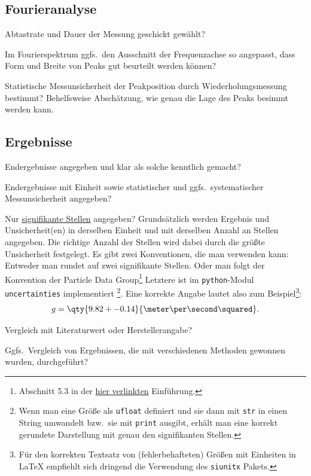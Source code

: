 \documentclass[twoside]{protokoll}
\begin{document}
\subsection*{Fourieranalyse}
\begin{checklist}
\item Abtastrate und Dauer der Messung geschickt gewählt?
\item Im Fourierspektrum ggfs.~den Ausschnitt der Frequenzachse so
  angepasst, dass Form und Breite von Peaks gut beurteilt werden
  können?
\item Statistische Messunsicherheit der Peakposition durch
  Wiederholungsmessung bestimmt? Behelfsweise Abschätzung, wie genau
  die Lage des Peaks besimmt werden kann.
\end{checklist}

\subsection*{Ergebnisse}
\begin{checklist}
\item Endergebnisse angegeben und klar als solche kenntlich gemacht?
\item Endergebnisse mit Einheit sowie statistischer und
  ggfs.~systematischer Messunsicherheit angegeben?
\item Nur
  \href{https://de.wikipedia.org/wiki/Signifikante_Stellen}{signifikante
    Stellen} angegeben? Grundsätzlich werden Ergebnis und
  Unsicherheit(en) in derselben Einheit und mit derselben Anzahl an
  Stellen angegeben. Die richtige Anzahl der Stellen wird dabei durch
  die größte Unsicherheit festgelegt. Es gibt zwei Konventionen, die
  man verwenden kann: Entweder man rundet auf zwei signifikante
  Stellen. Oder man folgt der Konvention der Particle Data
  Group\footnote{Abschnitt 5.3 in der
    \href{https://pdg.lbl.gov/2024/reviews/rpp2024-rev-rpp-intro.pdf}{hier
      verlinkten} Einführung.} Letztere ist im \texttt{python}-Modul
  \texttt{uncertainties} implementiert \footnote{Wenn man eine Größe
    als \texttt{ufloat} definiert und sie dann mit \texttt{str} in
    einen String umwandelt bzw.~sie mit \texttt{print} ausgibt, erhält
    man eine korrekt gerundete Darstellung mit genau den signifikanten
    Stellen.}. Eine korrekte Angabe lautet also zum
  Beispiel\footnote{Für den korrekten Textsatz von (fehlerbehafteten)
    Größen mit Einheiten in \LaTeX{} empfiehlt sich dringend die
    Verwendung des \texttt{siunitx} Pakets.}:
  \begin{displaymath}
    g=\qty{9.82+-0.14}{\meter\per\second\squared}.
  \end{displaymath}
\item Vergleich mit Literaturwert oder Herstellerangabe?
\item Ggfs.~Vergleich von Ergebnissen, die mit verschiedenen Methoden
  gewonnen wurden, durchgeführt?
\end{checklist}
\end{document}
